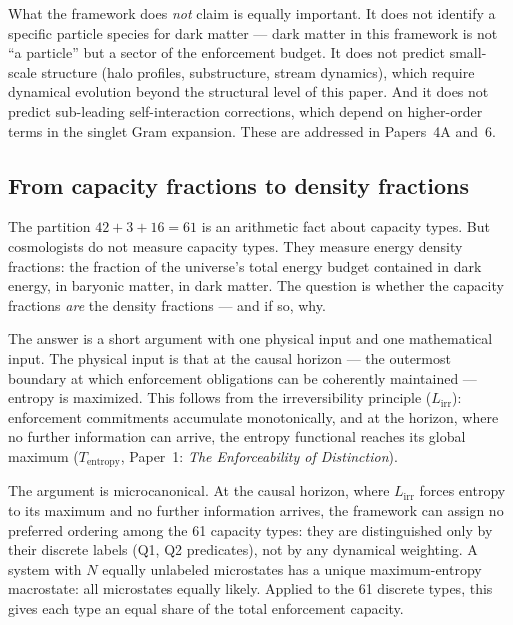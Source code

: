 \documentclass[11pt]{article}
\begin{document}
What the framework does \emph{not} claim is equally important.  It does not identify a specific particle species for dark matter --- dark matter in this framework is not ``a particle'' but a sector of the enforcement budget.  It does not predict small-scale structure (halo profiles, substructure, stream dynamics), which require dynamical evolution beyond the structural level of this paper.  And it does not predict sub-leading self-interaction corrections, which depend on higher-order terms in the singlet Gram expansion.  These are addressed in Papers~4A and~6.


\subsection{From capacity fractions to density fractions}

The partition $42 + 3 + 16 = 61$ is an arithmetic fact about capacity types.  But cosmologists do not measure capacity types.  They measure energy density fractions: the fraction of the universe's total energy budget contained in dark energy, in baryonic matter, in dark matter.  The question is whether the capacity fractions \emph{are} the density fractions --- and if so, why.

The answer is a short argument with one physical input and one mathematical input.  The physical input is that at the causal horizon --- the outermost boundary at which enforcement obligations can be coherently maintained --- entropy is maximized.  This follows from the irreversibility principle ($L_{\mathrm{irr}}$): enforcement commitments accumulate monotonically, and at the horizon, where no further information can arrive, the entropy functional reaches its global maximum ($T_{\mathrm{entropy}}$, Paper~1: \emph{The Enforceability of Distinction}).

The argument is microcanonical.  At the causal horizon, where $L_{\mathrm{irr}}$ forces entropy to its maximum and no further information arrives, the framework can assign no preferred ordering among the 61 capacity types: they are distinguished only by their discrete labels (Q1, Q2 predicates), not by any dynamical weighting.  A system with $N$ equally unlabeled microstates has a unique maximum-entropy macrostate: all microstates equally likely.  Applied to the 61 discrete types, this gives each type an equal share of the total enforcement capacity.
\end{document}

